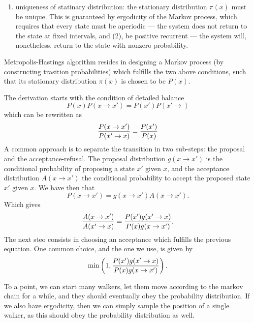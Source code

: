 \documentclass[aps,prc,twocolumn,floatfix]{revtex4}
\begin{document}
\begin{appendices}
\begin{enumerate}
  \item uniqueness of statinary distribution: the stationary distribution $\pi(x)$ must be unique. This is guaranteed by ergodicity of the Markov process, which requires that every state must be aperiodic --- the system does not return to the state at fixed intervals, and (2), be positive recurrent --- the system will, nonetheless, return to the state with nonzero probability.
 \end{enumerate}
 
 Metropolis-Hastings algorithm resides in designing a Markov process (by constructing trasition probabilities) which fulfills the two above conditions, such that its stationary distribution $\pi(x)$ is chosen to be $P(x)$.
 
 The derivation starts with the condition of detailed balance 
 \begin{equation}
  P(x)P(x\rightarrow x') = P(x')P(x'\rightarrow)
 \end{equation}
 which can be rewritten as 
 \begin{equation}
  {P(x\rightarrow x') \over P(x'\rightarrow x)} = {P(x') \over P(x)}
 \end{equation}
A common approach is to separate the transition in two sub-steps: the proposal and the acceptance-refusal. The proposal distribution $g(x\rightarrow x')$ is the conditional probability of proposing a state $x'$ given $x$, and the acceptance distribution $A(x\rightarrow x')$ the conditional probability to accept the proposed state $x'$ given $x$. We have then that 
\begin{equation}
 P(x\rightarrow x') = g(x\rightarrow x') A(x\rightarrow x').
\end{equation}
Which gives 
\begin{equation}
 {A(x\rightarrow x') \over A(x' \rightarrow x)} = {P(x')g(x'\rightarrow x) \over P(x)g(x \rightarrow x')}.
\end{equation}
The next steo consists in choosing an acceptance which fulfills the previous equation. One common choice, and the one we use, is given by 
\begin{equation}
\min \left( 1, {P(x')g(x'\rightarrow x) \over P(x)g(x\rightarrow x')} \right).
\end{equation}
 
 To a point, we can start many walkers, let them move according to the markov chain for a while, and they should eventually obey the probability distribution. If we also have ergodicity, then we can simply sample the position of a single walker, as this should obey the probability distribution as well. 
\end{appendices}
\end{document}
